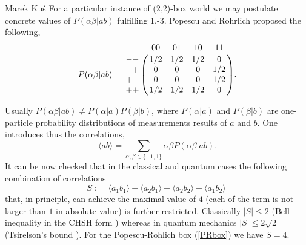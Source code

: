 \begin{artengenv}{Marek Ku\'s}
For a particular instance of (2,2)-box world we may postulate concrete values of $P(\alpha\beta| ab)$ fulfilling 1.-3. Popescu and Rohrlich \parencite*{popescu_quantum_1994}  proposed the following,
\begin{equation}\label{PRbox}
P(\alpha\beta|ab) = \bordermatrix{
	\mathrm{} &  00 &  01 &  10 &  11 \cr
	-- & 1/2 & 1/2 & 1/2 &   0 \cr
	-+ &   0 &   0 &   0 & 1/2\cr
	+- &   0 & 0   & 0   & 1/2\cr
	++ & 1/2 & 1/2 & 1/2 &   0
}.
\end{equation}    

Usually $P(\alpha\beta| ab)\ne P(\alpha|a)P(\beta|b)$, where $P(\alpha|a)$ and $P(\beta|b)$ are one-particle probability distributions of measurements results of $a$ and $b$. One introduces thus the correlations,
\begin{equation}\label{corr}
\langle ab \rangle = \sum_{\alpha,\beta\in\{-1,1\}}\alpha\beta P(\alpha\beta|ab).
\end{equation}
It can be now checked that in the classical and quantum cases the following combination of correlations
\begin{equation}\label{S}
S:=|\langle a_1 b_1 \rangle + \langle a_2 b_1 \rangle + \langle a_2 b_2\rangle - \langle a_1 b_2 \rangle|
\end{equation}
that, in principle, can achieve the maximal value of $4$ (each of the term is not larger than $1$ in absolute value) is further restricted. Classically $|S|\le 2$ (Bell \parencite*{kus_bell_einstein-podolsky-rosen_1964} inequality in the CHSH form \parencite{clauser_proposed_1969}) whereas in quantum mechanics $|S|\le 2\sqrt{2}$ (Tsirelson's bound \parencite{cirelson_quantum_1980}).  
For the Popescu-Rohlich box (\ref{PRbox}) we have $S=4$.


\end{artengenv}
